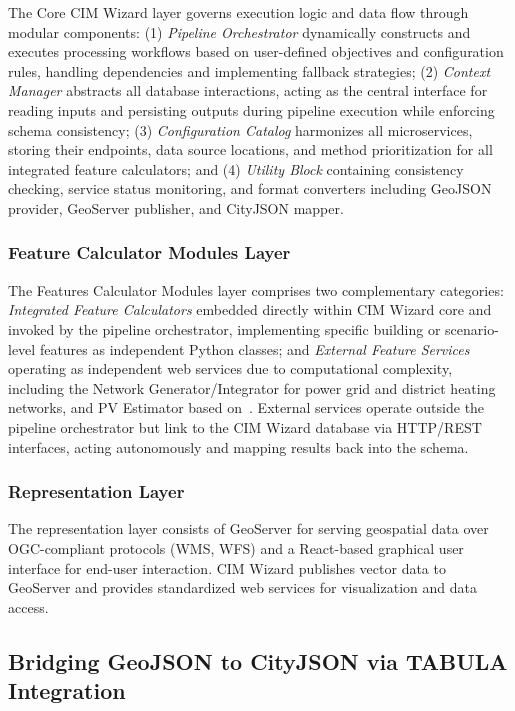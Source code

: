 The Core CIM Wizard layer governs execution logic and data flow through modular components: (1) \textit{Pipeline Orchestrator} dynamically constructs and executes processing workflows based on user-defined objectives and configuration rules, handling dependencies and implementing fallback strategies; (2) \textit{Context Manager} abstracts all database interactions, acting as the central interface for reading inputs and persisting outputs during pipeline execution while enforcing schema consistency; (3) \textit{Configuration Catalog} harmonizes all microservices, storing their endpoints, data source locations, and method prioritization for all integrated feature calculators; and (4) \textit{Utility Block} containing consistency checking, service status monitoring, and format converters including GeoJSON provider, GeoServer publisher, and CityJSON mapper.

\subsubsection{Feature Calculator Modules Layer}

The Features Calculator Modules layer comprises two complementary categories: \textit{Integrated Feature Calculators} embedded directly within CIM Wizard core and invoked by the pipeline orchestrator, implementing specific building or scenario-level features as independent Python classes; and \textit{External Feature Services} operating as independent web services due to computational complexity, including the Network Generator/Integrator for power grid and district heating networks, and PV Estimator based on~\cite{bottaccioli2017gis}. External services operate outside the pipeline orchestrator but link to the CIM Wizard database via HTTP/REST interfaces, acting autonomously and mapping results back into the schema.

\subsubsection{Representation Layer}

The representation layer consists of GeoServer for serving geospatial data over OGC-compliant protocols (WMS, WFS) and a React-based graphical user interface for end-user interaction. CIM Wizard publishes vector data to GeoServer and provides standardized web services for visualization and data access.

\subsection{Bridging GeoJSON to CityJSON via TABULA Integration}


